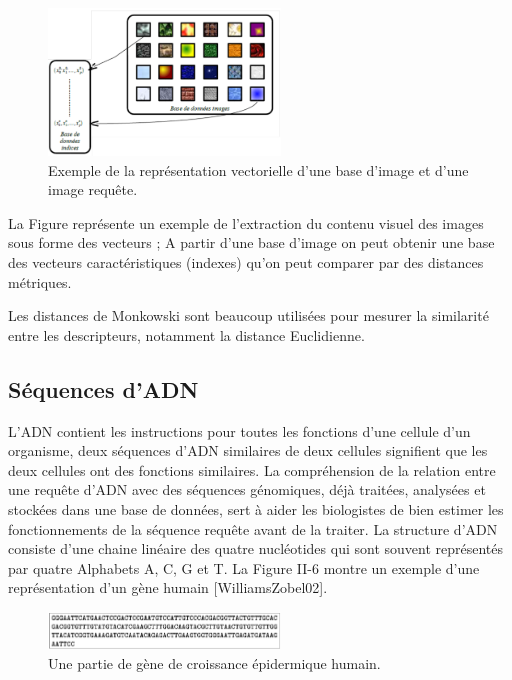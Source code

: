 \begin{figure}[H]
	\centering
	\includegraphics[width=0.55\textwidth]{Figures/horsligne.png} %
	\caption{Exemple de la représentation vectorielle d'une base d'image et d'une image requête.}
\end{figure}
La Figure représente un exemple de l’extraction du contenu visuel des images sous forme des vecteurs ; A partir d’une base d’image on peut obtenir une base des vecteurs caractéristiques (indexes) qu’on peut comparer par des distances métriques.

Les distances de Monkowski sont beaucoup utilisées pour mesurer la similarité entre les descripteurs, notamment la distance Euclidienne. 

\subsection{Séquences d’ADN}
L'ADN contient les instructions pour toutes les fonctions d’une cellule d’un organisme, deux séquences d’ADN similaires de deux cellules signifient que les deux cellules ont des fonctions similaires. La compréhension de la relation entre une requête d’ADN avec des séquences génomiques, déjà traitées, analysées et stockées dans une base de données, sert à aider les biologistes de bien estimer les fonctionnements de la séquence requête avant de la traiter. La structure d’ADN consiste d’une chaine linéaire des quatre nucléotides qui sont souvent représentés par quatre Alphabets A, C, G et T. La Figure II-6 montre un exemple d’une
représentation d’un gène humain [WilliamsZobel02].

\begin{figure}[H]
	\centering
	\includegraphics[width=0.55\textwidth]{Figures/ADN} %
	\caption{Une partie de gène de croissance épidermique humain.}
\end{figure}

